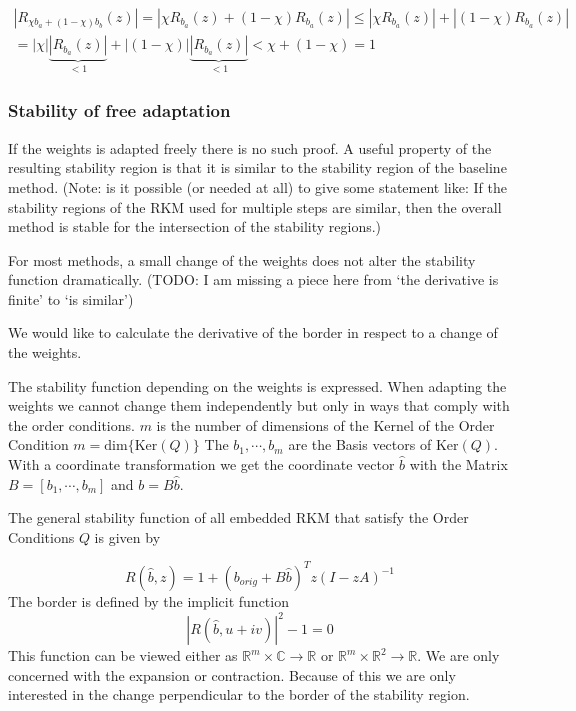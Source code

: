\documentclass[a4paper]{article}
\numberwithin{equation}{section}
\theoremstyle{plain}
\theoremstyle{definition}
\numberwithin{theorem}{section}
\newcommand{\R}{\mathbb{R}}
\newcommand{\CN}{\mathbb{C}}
\newcommand{\1}{\mathbbm{1}}
\begin{document}
\begin{multline}
|R_{\chi b_a +(1-\chi) b_b}(z)| = |\chi R_{b_a}(z) + (1-\chi) R_{b_a}(z)| \leq |\chi R_{b_a}(z)| + |(1-\chi) R_{b_a}(z)|\\
 =| \chi| \underbrace{|R_{b_a}(z)|}_{<1} + |(1-\chi)| \underbrace{|R_{b_a}(z)|}_{<1} < \chi + (1-\chi)= 1
\end{multline}



\subsubsection{Stability of free adaptation}
If the weights is adapted freely there is no such proof.
A useful property of the resulting stability region is that it is similar to the stability region of the baseline method. 
(Note: is it possible (or needed at all) to give some statement like: If the stability regions of the RKM used for multiple steps are similar, then the overall method is stable for the intersection of the stability regions.)

For most methods, a small change of the weights does not alter the stability function dramatically.
(TODO: I am missing a piece here from ‘the derivative is finite’ to ‘is similar’)

We would like to calculate the derivative of the border in respect to a change of the weights. 

The stability function depending on the weights is expressed. 
When adapting the weights we cannot change them independently but only in ways that comply with the order conditions.
$m$ is the number of dimensions of the Kernel of the Order Condition $m = \mathrm{dim}\{\mathrm{Ker} (Q) \}$
The $b_1,\cdots,b_m$  are the Basis vectors of $\mathrm{Ker} (Q)$. With a coordinate transformation we get the coordinate vector $\hat{b}$ with the Matrix $B = [b_1,\cdots,b_m]$ and $b = B \hat{b}$.

The general stability function of all embedded RKM that satisfy the Order Conditions $Q$ is given by 

\begin{equation}\label{eq:gen_stabilityf}
R(\hat{b},z) = 1 +  (b_{orig} +B \hat{b})^T z(I - zA)^{-1}
\end{equation}
The border is defined by the implicit function 
\begin{equation}\label{eq:border}
|R(\hat{b},u+iv)|^2 -1 = 0
\end{equation}
This function can be viewed either as $\R^m \times  \CN \rightarrow \R$ or $\R^m \times  \R^2 \rightarrow \R$.
We are only concerned with the expansion or contraction. Because of this we are only interested in the change perpendicular to the border of the stability region. 
\end{document}
